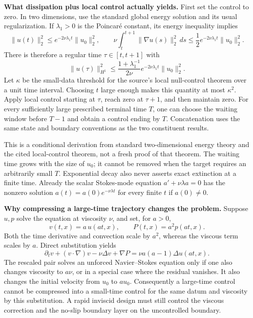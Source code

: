 \documentclass[11pt]{article}
\begin{document}
\textbf{What dissipation plus local control actually yields.}
First set the control to zero.  In two dimensions, use the standard global
energy solution and its usual regularization.  If $\lambda_1>0$ is the
Poincar\'e constant, its energy inequality implies
\[
 \|u(t)\|_2^2\leq e^{-2\nu\lambda_1t}\|u_0\|_2^2,
 \qquad
 \nu\int_t^{t+1}\|\nabla u(s)\|_2^2\,ds
 \leq\frac12e^{-2\nu\lambda_1t}\|u_0\|_2^2.
\]
There is therefore a regular time $\tau\in[t,t+1]$ with
\[
 \|u(\tau)\|_{H^1}^2
 \leq\frac{1+\lambda_1^{-1}}{2\nu}
               e^{-2\nu\lambda_1t}\|u_0\|_2^2.
\]
Let $\kappa$ be the small-data threshold for the source's local null-control
theorem over a unit time interval.  Choosing $t$ large enough makes this
quantity at most $\kappa^2$.  Apply local control starting at $\tau$, reach
zero at $\tau+1$, and then maintain zero.  For every sufficiently large
prescribed terminal time $T$, one can choose the waiting window before
$T-1$ and obtain a control ending by $T$.  Concatenation uses the same state
and boundary conventions as the two constituent results.

This is a conditional derivation from standard two-dimensional energy theory
and the cited local-control theorem, not a fresh proof of that theorem.
The waiting time grows with the size of $u_0$; it cannot be removed when the
target requires an arbitrarily small $T$.  Exponential decay also never
asserts exact extinction at a finite time.  Already the scalar Stokes-mode
equation $a'+\nu\lambda a=0$ has the nonzero solution
$a(t)=a(0)e^{-\nu\lambda t}$ for every finite $t$ if $a(0)\ne0$.

\textbf{Why compressing a large-time trajectory changes the problem.}
Suppose $u,p$ solve the equation at viscosity $\nu$, and set, for $a>0$,
\[
 v(t,x)=a\,u(at,x),\qquad P(t,x)=a^2p(at,x).
\]
Both the time derivative and convection scale by $a^2$, whereas the viscous
term scales by $a$.  Direct substitution yields
\[
 \partial_tv+(v\cdot\nabla)v-\nu\Delta v+\nabla P
 =\nu a(a-1)\Delta u(at,x).
\]
The rescaled pair solves an unforced Navier--Stokes equation only if one
also changes viscosity to $a\nu$, or in a special case where the residual
vanishes.  It also changes the initial velocity from $u_0$ to $a u_0$.
Consequently a large-time control cannot be compressed into a small-time
control for the same datum and viscosity by this substitution.  A rapid
inviscid design must still control the viscous correction and the no-slip
boundary layer on the uncontrolled boundary.
\end{document}

